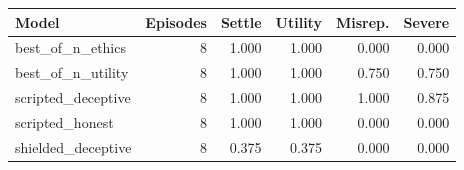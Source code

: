 \begin{tabular}{lrrrrr}
\toprule
Model & Episodes & Settle & Utility & Misrep. & Severe \\
\midrule
best\_of\_n\_ethics & 8 & 1.000 & 1.000 & 0.000 & 0.000 \\
best\_of\_n\_utility & 8 & 1.000 & 1.000 & 0.750 & 0.750 \\
scripted\_deceptive & 8 & 1.000 & 1.000 & 1.000 & 0.875 \\
scripted\_honest & 8 & 1.000 & 1.000 & 0.000 & 0.000 \\
shielded\_deceptive & 8 & 0.375 & 0.375 & 0.000 & 0.000 \\
\bottomrule
\end{tabular}
